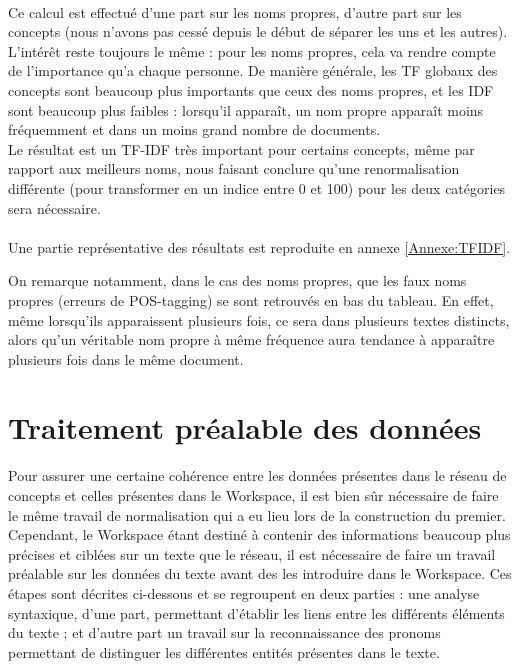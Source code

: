 \documentclass[a4paper, 12pt]{article}
\begin{document}
\paragraph{}
Ce calcul est effectué d'une part sur les noms propres, d'autre part sur les concepts (nous n'avons pas cessé depuis le début de séparer les uns et les autres). L'intérêt reste toujours le même : pour les noms propres, cela va rendre compte de l'importance qu'a chaque personne. De manière générale, les TF globaux des concepts sont beaucoup plus importants que ceux des noms propres, et les IDF sont beaucoup plus faibles : lorsqu'il apparaît, un nom propre apparaît moins fréquemment et dans un moins grand nombre de documents.\\

Le résultat est un TF-IDF très important pour certains concepts, même par rapport aux meilleurs noms, nous faisant conclure qu'une renormalisation différente (pour transformer en un indice entre 0 et 100) pour les deux catégories sera nécessaire.

\paragraph{}
Une partie représentative des résultats est reproduite en annexe \ref{Annexe:TFIDF}.

On remarque notamment, dans le cas des noms propres, que les faux noms propres (erreurs de POS-tagging) se sont retrouvés en bas du tableau. En effet, même lorsqu'ils apparaissent plusieurs fois, ce sera dans plusieurs textes distincts, alors qu'un véritable nom propre à même fréquence aura tendance à apparaître plusieurs fois dans le même document.


\section{Traitement préalable des données}

Pour assurer une certaine cohérence entre les données présentes dans le réseau de concepts et celles présentes dans le Workspace, il est bien sûr nécessaire de faire le même travail de normalisation qui a eu lieu lors de la construction du premier. Cependant, le Workspace étant destiné à contenir des informations beaucoup plus précises et ciblées sur un texte que le réseau, il est nécessaire de faire un travail préalable sur les données du texte avant des les introduire dans le Workspace. Ces étapes sont décrites ci-dessous et se regroupent en deux parties : une analyse syntaxique, d'une part, permettant d'établir les liens entre les différents éléments du texte ; et d'autre part un travail sur la reconnaissance des pronoms permettant de distinguer les différentes entités présentes dans le texte.
\end{document}
